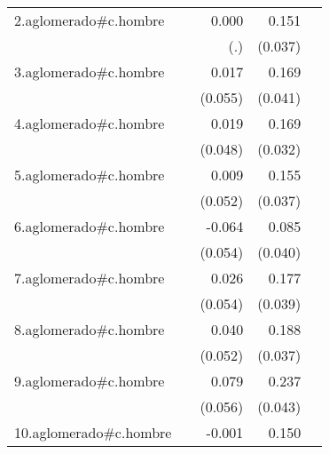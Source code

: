 {\begin{longtable}{l*{4}{D{.}{.}{-1}}}
\addlinespace
2.aglomerado#c.hombre&                     &       0.000         &       0.151\sym{***}&                     \\
            &                     &         (.)         &     (0.037)         &                     \\
\addlinespace
3.aglomerado#c.hombre&                     &       0.017         &       0.169\sym{***}&                     \\
            &                     &     (0.055)         &     (0.041)         &                     \\
\addlinespace
4.aglomerado#c.hombre&                     &       0.019         &       0.169\sym{***}&                     \\
            &                     &     (0.048)         &     (0.032)         &                     \\
\addlinespace
5.aglomerado#c.hombre&                     &       0.009         &       0.155\sym{***}&                     \\
            &                     &     (0.052)         &     (0.037)         &                     \\
\addlinespace
6.aglomerado#c.hombre&                     &      -0.064         &       0.085\sym{*}  &                     \\
            &                     &     (0.054)         &     (0.040)         &                     \\
\addlinespace
7.aglomerado#c.hombre&                     &       0.026         &       0.177\sym{***}&                     \\
            &                     &     (0.054)         &     (0.039)         &                     \\
\addlinespace
8.aglomerado#c.hombre&                     &       0.040         &       0.188\sym{***}&                     \\
            &                     &     (0.052)         &     (0.037)         &                     \\
\addlinespace
9.aglomerado#c.hombre&                     &       0.079         &       0.237\sym{***}&                     \\
            &                     &     (0.056)         &     (0.043)         &                     \\
\addlinespace
10.aglomerado#c.hombre&                     &      -0.001         &       0.150\sym{***}&                     \\

\end{longtable}}
